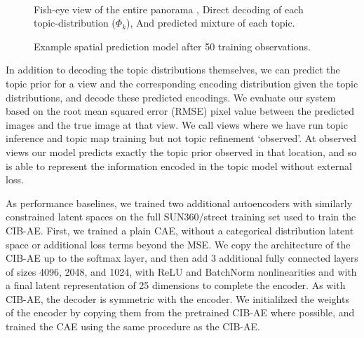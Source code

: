 \begin{figure}
{\begin{minipage}{0.6\textwidth}
{        } \\
    \end{minipage}
    }
    
    \caption{Example spatial prediction model after 50 training observations. \protect{}} Fish-eye view of the entire panorama \protect{}, Direct decoding of each topic-distribution ($\Phi_k$), And \protect{} predicted mixture of each topic.
    \label{fig:pano-2}
\end{figure}

In addition to decoding the topic distributions themselves, we can predict the topic prior for a view and the corresponding encoding distribution given the topic distributions, and decode these predicted encodings. We evaluate our system based on the root mean squared error (RMSE) pixel value between the predicted images and the true image at that view. We call views where we have run topic inference and topic map training but not topic refinement `observed'. At observed views our model predicts exactly the topic prior observed in that location, and so is able to represent the information encoded in the topic model without external loss.

As performance baselines, we trained two additional autoencoders with similarly constrained latent spaces on the full SUN360/street training set used to train the CIB-AE. First, we trained a plain CAE, without a categorical distribution latent space or additional loss terms beyond the MSE. We copy the architecture of the CIB-AE up to the softmax layer, and then add 3 additional fully connected layers of sizes 4096, 2048, and 1024, with ReLU and BatchNorm nonlinearities and with a final latent representation of 25 dimensions to complete the encoder. As with CIB-AE, the decoder is symmetric with the encoder. We initialilzed the weights of the encoder by copying them from the pretrained CIB-AE where possible, and trained the CAE using the same procedure as the CIB-AE.

